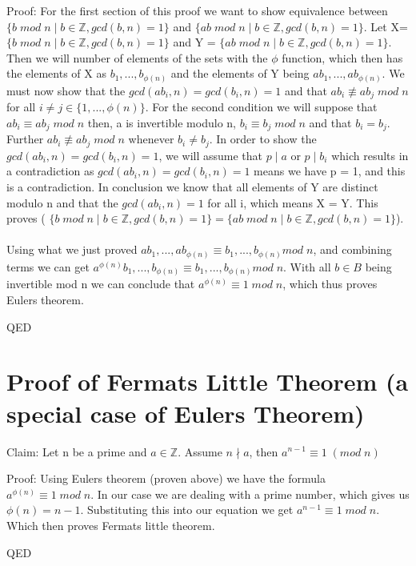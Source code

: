 \documentclass{article}
\begin{document}
Proof: 
For the first section of this proof we want to show equivalence between $\{ b\; mod \; n \mid b \in \mathbb{Z}, gcd(b,n)=1\}$ and $\{ab \; mod \; n \mid b \in \mathbb{Z}, gcd(b,n)=1\}$. Let X= $\{ b\; mod \; n \mid b \in \mathbb{Z}, gcd(b,n)=1\}$ and Y = $\{ab \; mod \; n \mid b \in \mathbb{Z}, gcd(b,n)=1\}$. Then we will number of elements of the sets with the $\phi$ function, which then has the elements of X as $b_1,...,b_{\phi(n)}$ and the elements of Y being $ab_1, ..., ab_{\phi(n)}$. We must now show that the $gcd(ab_i,n) = gcd(b_i, n) = 1$ and that $ab_i \not\equiv ab_j \; mod \; n$ for all $i \neq j \in \{1,...,\phi(n)\}$. For the second condition we will suppose that $ab_i \equiv ab_j \; mod \;n$ then, a is invertible modulo n, $b_i \equiv b_j \; mod \; n$ and that $b_i = b_j$. Further $ab_i \not\equiv ab_j \; mod \; n$ whenever $b_i \neq b_j$. In order to show the $gcd(ab_i,n) = gcd(b_i, n) = 1$, we will assume that $p \mid a$ or $p \mid b_i$ which results in a contradiction as $gcd(ab_i,n) = gcd(b_i, n) = 1$ means we have p = 1, and this is a contradiction. In conclusion we know that all elements of Y are distinct modulo n and that the $gcd(ab_i,n) =1$ for all i, which means X = Y. This proves ( $\{ b\; mod \; n \mid b \in \mathbb{Z}, gcd(b,n)=1\} = \{ab \; mod \; n \mid b \in \mathbb{Z}, gcd(b,n)=1\}$).
\\
\\
Using what we just proved $ab_1,...,ab_{\phi(n)} \equiv  b_1, ..., b_{\phi(n)} mod \; n$, and combining terms we can get $a^{\phi(n)} b_1, ..., b_{\phi(n)} \equiv b_1,...,b_{\phi(n)} mod \; n$. With all $b \in B$ being invertible mod n we can conclude that $a^{\phi(n)} \equiv 1 \; mod \; n$, which thus proves Eulers theorem. 

QED

\pagebreak
\section{Proof of Fermats Little Theorem (a special case of Eulers Theorem)}

Claim: Let n be a prime and $a \in \mathbb{Z}$. Assume $n \nmid a$, then $a^{n-1} \equiv 1  \; (mod \; n)$

Proof: Using Eulers theorem (proven above) we have the formula $a^{\phi(n)} \equiv 1 \; mod \; n$. In our case we are dealing with a prime number, which gives us $\phi(n) = n-1$. Substituting this into our equation we get $a^{n-1} \equiv 1 \; mod \; n$. Which then proves Fermats little theorem. 

QED
\end{document}
